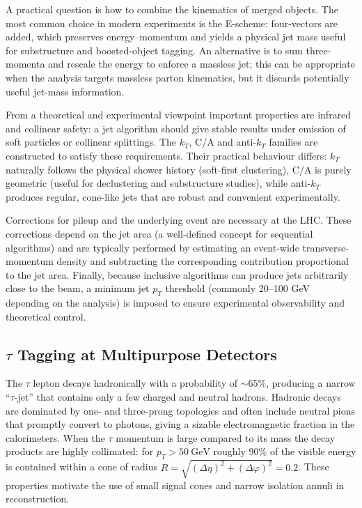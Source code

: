 A practical question is how to combine the kinematics of merged objects. The most common choice in modern experiments is the E-scheme: four-vectors are added, which preserves energy–momentum and yields a physical jet mass useful for substructure and boosted-object tagging. An alternative is to sum three-momenta and rescale the energy to enforce a massless jet; this can be appropriate when the analysis targets massless parton kinematics, but it discards potentially useful jet-mass information.

From a theoretical and experimental viewpoint important properties are infrared and collinear safety: a jet algorithm should give stable results under emission of soft particles or collinear splittings. The \(k_T\), C/A and anti-\(k_T\) families are constructed to satisfy these requirements. Their practical behaviour differs: \(k_T\) naturally follows the physical shower history (soft-first clustering), C/A is purely geometric (useful for declustering and substructure studies), while anti-\(k_T\) produces regular, cone-like jets that are robust and convenient experimentally.

Corrections for pileup and the underlying event are necessary at the LHC. These corrections depend on the jet area (a well-defined concept for sequential algorithms) and are typically performed by estimating an event-wide transverse-momentum density and subtracting the corresponding contribution proportional to the jet area. Finally, because inclusive algorithms can produce jets arbitrarily close to the beam, a minimum jet \(p_T\) threshold (commonly 20–100 GeV depending on the analysis) is imposed to ensure experimental observability and theoretical control.

\subsection{$\tau$ Tagging at Multipurpose Detectors}

The $\tau$ lepton decays hadronically with a probability of $\sim65\%$, producing a narrow ``$\tau$-jet'' that contains only a few charged and neutral hadrons. Hadronic decays are dominated by one- and three-prong topologies and often include neutral pions that promptly convert to photons, giving a sizable electromagnetic fraction in the calorimeters. When the $\tau$ momentum is large compared to its mass the decay products are highly collimated: for $p_T>50\ \mathrm{GeV}$ roughly $90\%$ of the visible energy is contained within a cone of radius $R=\sqrt{(\Delta\eta)^2+(\Delta\varphi)^2}=0.2$. These properties motivate the use of small signal cones and narrow isolation annuli in reconstruction.


